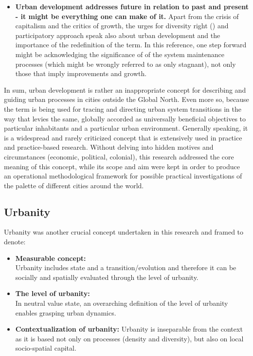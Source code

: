 \documentclass[11pt]{report}
\begin{document}
{\begin{itemize}
\item \textbf{Urban development addresses future in relation to past and present - it might be everything one can make of it.}
Apart from the crisis of capitalism and the critics of growth, the
urges for diversity right (\href{Amin}{\citealt{amin_good_2006}}) and participatory approach speak also about urban development and the importance of the redefinition of the term. 
In this reference, one step forward might be acknowledging the significance of of the system maintenance processes (which might be wrongly referred to as only stagnant), not only those that imply improvements and growth.
\end{itemize}

In sum, urban development is rather an inappropriate concept for describing and guiding urban processes in cities outside the Global North.
Even more so, because the term is being used for tracing and directing urban system transitions in the way that levies the same, globally accorded as universally beneficial objectives to particular inhabitants and a particular urban environment.
Generally speaking, it is a widespread and rarely criticized concept that is extensively used in practice and practice-based research.
Without delving into hidden motives and circumstances (economic, political, colonial), this research addressed the core meaning of this concept, while its scope and aim were kept in order to produce an operational methodological framework for possible practical investigations of the palette of different cities around the world.

\subsection{Urbanity}

Urbanity was another crucial concept undertaken in this research and framed to denote:

\begin{itemize}
\item \textbf{Measurable concept:}
\\
Urbanity includes state and a transition/evolution and therefore it can be socially and spatially evaluated through the level of urbanity.

\item \textbf{The level of urbanity:}
\\
In neutral value state, an overarching definition of the level of urbanity enables grasping urban dynamics.

\item \textbf{Contextualization of urbanity:}
Urbanity is inseparable from the context as it is based not only on processes (density and diversity), but also  on local socio-spatial capital.


\end{itemize}}
\end{document}
